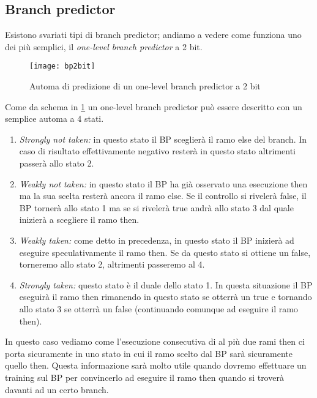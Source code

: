 		\subsection{Branch predictor}
			Esistono svariati tipi di branch predictor; andiamo a vedere come funziona uno dei più semplici, il \emph{one-level branch predictor} a 2 bit.
			
			\begin{figure}
				\begin{center}
					\texttt{[image: bp2bit]}
					\caption{Automa di predizione di un one-level branch predictor a 2 bit}
					\label{fig:bp2bits}
				\end{center}
			\end{figure}
		
			Come da schema in \cref{fig:bp2bits} un one-level branch predictor può essere descritto con un semplice automa a 4 stati.
			
			\begin{enumerate}
				\item \emph{Strongly not taken:} in questo stato il \ac{BP} sceglierà il ramo else del branch. In caso di risultato effettivamente negativo resterà in questo stato altrimenti passerà allo stato 2.
				\item \emph{Weakly not taken:} in questo stato il \ac{BP} ha già osservato una esecuzione then ma la sua scelta resterà ancora il ramo else. Se il controllo si rivelerà false, il \ac{BP} tornerà allo stato 1 ma se si rivelerà true andrà allo stato 3 dal quale inizierà a scegliere il ramo then.
				\item \emph{Weakly taken:} come detto in precedenza, in questo stato il \ac{BP} inizierà ad eseguire speculativamente il ramo then. Se da questo stato si ottiene un false, torneremo allo stato 2, altrimenti passeremo al 4.
				\item \emph{Strongly taken:} questo stato è il duale dello stato 1. In questa situazione il \ac{BP} eseguirà il ramo then rimanendo in questo stato se otterrà un true e tornando allo stato 3 se otterrà un false (continuando comunque ad eseguire il ramo then).
			\end{enumerate}
		
			In questo caso vediamo come l'esecuzione consecutiva di al più due rami then ci porta sicuramente in uno stato in cui il ramo scelto dal \ac{BP} sarà sicuramente quello then. Questa informazione sarà molto utile quando dovremo effettuare un training sul \ac{BP} per convincerlo ad eseguire il ramo then quando si troverà davanti ad un certo branch.
			
